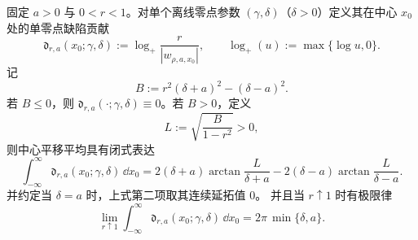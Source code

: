 \begin{theorem}[单零点缺陷贡献的中心平移平均闭式与极限律]\label{thm:xi-singlezero-defect-translation-average}
固定 \(a>0\) 与 \(0<r<1\)。对单个离线零点参数 \((\gamma,\delta)\)（\(\delta>0\)）定义其在中心 \(x_0\) 处的单零点缺陷贡献
\begin{equation}\label{eq:xi-singlezero-defect-pointwise}
\mathfrak d_{r,a}(x_0;\gamma,\delta)
:=\log_+\frac{r}{|w_{\rho,a,x_0}|},
\qquad
\log_+(u):=\max\{\log u,0\}.
\end{equation}
记
\begin{equation}\label{eq:xi-singlezero-defect-B}
B:=r^2(\delta+a)^2-(\delta-a)^2.
\end{equation}
若 \(B\le 0\)，则 \(\mathfrak d_{r,a}(\cdot;\gamma,\delta)\equiv 0\)。若 \(B>0\)，定义
\begin{equation}\label{eq:xi-singlezero-defect-L}
L:=\sqrt{\frac{B}{1-r^2}}>0,
\end{equation}
则中心平移平均具有闭式表达
\begin{equation}\label{eq:xi-singlezero-defect-translation-average}
\int_{-\infty}^{\infty}\mathfrak d_{r,a}(x_0;\gamma,\delta)\,\dd x_0
=
2(\delta+a)\arctan\!\frac{L}{\delta+a}
-2(\delta-a)\arctan\!\frac{L}{\delta-a}.
\end{equation}
并约定当 \(\delta=a\) 时，上式第二项取其连续延拓值 \(0\)。
并且当 \(r\uparrow 1\) 时有极限律
\begin{equation}\label{eq:xi-singlezero-defect-translation-average-limit}
\lim_{r\uparrow 1}\int_{-\infty}^{\infty}\mathfrak d_{r,a}(x_0;\gamma,\delta)\,\dd x_0
=2\pi\,\min\{\delta,a\}.
\end{equation}
\end{theorem}
